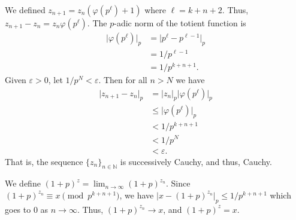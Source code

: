 \documentclass[12 pt, letterpaper]{hmcpset}
\begin{document}
\begin{solution}
	We defined $z_{n + 1} = z_{n} (\varphi(p^{\ell}) + 1)$ where $\ell = k + n + 2$. Thus, $z_{n + 1} - z_{n} = z_{n} \varphi(p^{\ell})$. The $p$-adic norm of the totient function is
	\begin{align*}
		\lvert \varphi(p^{\ell}) \rvert_{p} & = \lvert p^{\ell} - p^{\ell - 1} \rvert_{p} \\
						    & = 1 / p^{\ell - 1} \\
						    & = 1 / p^{k + n + 1}.
	\end{align*}
	Given $\varepsilon > 0$, let $1 / p^{N} < \varepsilon$. Then for all $n > N$ we have
	\begin{align*}
		\lvert z_{n + 1} - z_{n} \rvert_{p} & = \lvert z_{n} \rvert_{p} \lvert \varphi(p^{\ell}) \rvert_{p} \\
						    & \le \lvert \varphi(p^{\ell}) \rvert_{p} \\
						    & < 1/ p^{k + n + 1} \\
						    & < 1 / p^{N} \\
						    & < \varepsilon.
	\end{align*}
	That is, the sequence $\{ z_{n} \}_{n \in \mathbb{N}}$ is successively Cauchy, and thus, Cauchy.

	We define $(1 + p)^{z} = \lim_{n \to \infty} (1 + p)^{z_{n}}$. Since $(1 + p)^{z_{n}} \equiv x \pmod{p^{k + n + 1}}$, we have $\lvert x - (1 + p)^{z_{n}} \rvert_{p} \le {1}/{p^{k + n + 1}}$ which goes to $0$ as $n \to \infty$. Thus, $(1 + p)^{z_{n}} \to x$, and $(1 + p)^{z} = x$.
\end{solution}
\end{document}
